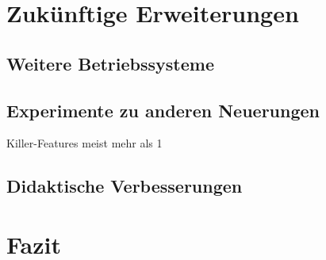 \section{Zukünftige Erweiterungen}
\label{sec:future}

		\subsection{Weitere Betriebssysteme}
	
		\subsection{Experimente zu anderen Neuerungen}
		
		Killer-Features meist mehr als 1				
		

		\subsection{Didaktische Verbesserungen}


\section{Fazit}
\label{sec:evaluation}
	
